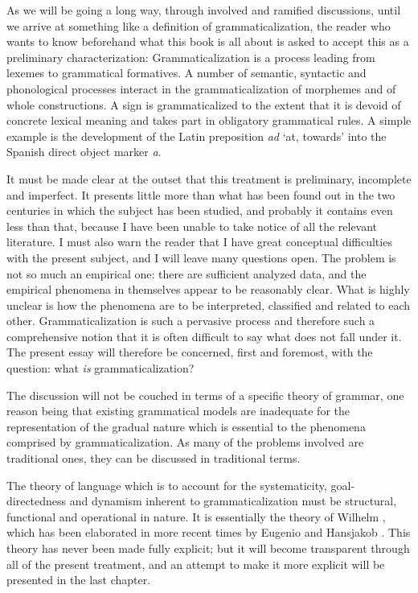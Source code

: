 
As we will be going a long way, through involved and ramified discussions, until we arrive at something like a definition of grammaticalization, the reader who wants to know beforehand what this book is all about is asked to accept this as a preliminary characterization: Grammaticalization is a process leading from lexemes to grammatical formatives. A number of semantic, syntactic and phonological processes interact in the grammaticalization of morphemes and of whole constructions. A sign is grammaticalized to the extent that it is devoid of concrete lexical meaning and takes part in obligatory grammatical rules. A simple example is the development of the Latin preposition \textit{ad} ‘at, towards’ into the Spanish direct object marker \textit{a}.

It must be made clear at the outset that this treatment is preliminary, incomplete and imperfect. It presents little more than what has been found out in the two centuries in which the subject has been studied, and probably it contains even less than that, because I have been unable to take notice of all the relevant literature. I must also warn the reader that I have great conceptual difficulties with the present subject, and I will leave many questions open. The problem is not so much an empirical one: there are sufficient analyzed data, and the empirical phenomena in themselves appear to be reasonably clear. What is highly unclear is how the phenomena are to be interpreted, classified and related to each other. Grammaticalization is such a pervasive process and therefore such a comprehensive notion that it is often difficult to say what does not fall under it. The present essay will therefore be concerned, first and foremost, with the question: what \textit{is} grammaticalization?

The discussion will not be couched in terms of a specific theory of grammar, one reason being that existing grammatical models are inadequate for the representation of the gradual nature which is essential to the phenomena comprised by grammaticalization. As many of the problems involved are traditional ones, they can be discussed in traditional terms.

The theory of language which is to account for the systematicity, goal-\linebreak directedness and dynamism inherent to grammaticalization must be structural, functional and operational in nature. It is essentially the theory of Wilhelm \citet{Humboldt1836}, which has been elaborated in more recent times by Eugenio \citet{Coseriu1974} and Hansjakob \citet{Seiler1978}. This theory has never been made fully explicit; but it will become transparent through all of the present treatment, and an attempt to make it more explicit will be presented in the last chapter.

